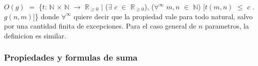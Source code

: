 \documentclass[10pt,a4paper]{article}
\begin{document}
\newline
\newline
$O(g)$ $=$ \{$t$: $\mathbb{N}$ $\times$ $\mathbb{N}$ $\to$ $\mathbb{R}_{\geq 0}$ $|$ ($\exists$ $c$ $\in$ $\mathbb{R}_{\geq 0}$), ($\forall^{\infty}$ $m,n$ $\in$ $\mathbb{N}$) $[t(m,n)$ $\leq$ $c$ . $g(n,m)]$\}
\newline
\newline
donde $\forall^{\infty}$ quiere decir que la propiedad vale para todo natural, salvo por una cantidad finita de excepciones. Para el caso general de $n$ parametros, la definicion es similar.

\subsubsection{Propiedades y formulas de suma}
\end{document}
